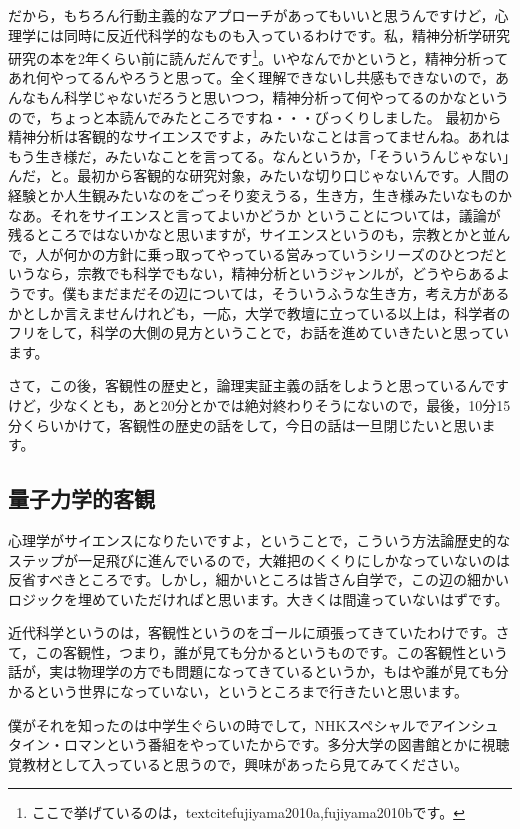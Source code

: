 \documentclass{ltjsbook}
\begin{document}
だから，もちろん行動主義的なアプローチがあってもいいと思うんですけど，心理学には同時に反近代科学的なものも入っているわけです。私，精神分析学研究研究の本を2年くらい前に読んだんです\footnote{ここで挙げているのは，textcite{fujiyama2010a,fujiyama2010b}です。}。いやなんでかというと，精神分析ってあれ何やってるんやろうと思って。全く理解できないし共感もできないので，あんなもん科学じゃないだろうと思いつつ，精神分析って何やってるのかなというので，ちょっと本読んでみたところですね・・・びっくりしました。
最初から精神分析は客観的なサイエンスですよ，みたいなことは言ってませんね。あれはもう生き様だ，みたいなことを言ってる。なんというか，「そういうんじゃない」んだ，と。最初から客観的な研究対象，みたいな切り口じゃないんです。人間の経験とか人生観みたいなのをごっそり変えうる，生き方，生き様みたいなものかなあ。それをサイエンスと言ってよいかどうか ということについては，議論が残るところではないかなと思いますが，サイエンスというのも，宗教とかと並んで，人が何かの方針に乗っ取ってやっている営みっていうシリーズのひとつだというなら，宗教でも科学でもない，精神分析というジャンルが，どうやらあるようです。僕もまだまだその辺については，そういうふうな生き方，考え方があるかとしか言えませんけれども，一応，大学で教壇に立っている以上は，科学者のフリをして，科学の大側の見方ということで，お話を進めていきたいと思っています。

さて，この後，客観性の歴史と，論理実証主義の話をしようと思っているんですけど，少なくとも，あと20分とかでは絶対終わりそうにないので，最後，10分15分くらいかけて，客観性の歴史の話をして，今日の話は一旦閉じたいと思います。

\subsection{量子力学的客観}

心理学がサイエンスになりたいですよ，ということで，こういう方法論歴史的なステップが一足飛びに進んでいるので，大雑把のくくりにしかなっていないのは反省すべきところです。しかし，細かいところは皆さん自学で，この辺の細かいロジックを埋めていただければと思います。大きくは間違っていないはずです。

近代科学というのは，客観性というのをゴールに頑張ってきていたわけです。さて，この客観性，つまり，誰が見ても分かるというものです。この客観性という話が，実は物理学の方でも問題になってきているというか，もはや誰が見ても分かるという世界になっていない，というところまで行きたいと思います。

僕がそれを知ったのは中学生ぐらいの時でして，NHKスペシャルでアインシュタイン・ロマンという番組をやっていたからです。多分大学の図書館とかに視聴覚教材として入っていると思うので，興味があったら見てみてください。
\end{document}
